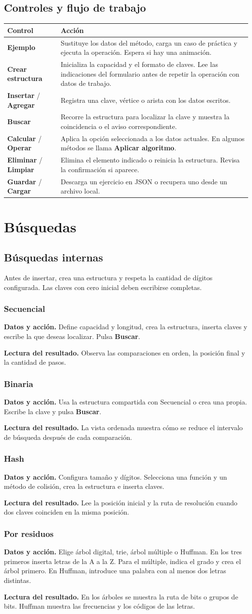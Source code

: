 \documentclass[11pt,a4paper]{report}
\newcommand{\boton}[1]{\textbf{#1}}
\newcommand{\metodo}[3]{\subsection{#1}\textbf{Datos y acción.} #2\par\textbf{Lectura del resultado.} #3}
\begin{document}
\section{Controles y flujo de trabajo}
\begin{tabularx}{\linewidth}{@{}p{.28\linewidth}X@{}}
\toprule
Control & Acción \\
\midrule
\boton{Ejemplo} & Sustituye los datos del método, carga un caso de práctica y ejecuta la operación. Espera si hay una animación. \\
\boton{Crear estructura} & Inicializa la capacidad y el formato de claves. Lee las indicaciones del formulario antes de repetir la operación con datos de trabajo. \\
\boton{Insertar} / \boton{Agregar} & Registra una clave, vértice o arista con los datos escritos. \\
\boton{Buscar} & Recorre la estructura para localizar la clave y muestra la coincidencia o el aviso correspondiente. \\
\boton{Calcular} / \boton{Operar} & Aplica la opción seleccionada a los datos actuales. En algunos métodos se llama \boton{Aplicar algoritmo}. \\
\boton{Eliminar} / \boton{Limpiar} & Elimina el elemento indicado o reinicia la estructura. Revisa la confirmación si aparece. \\
\boton{Guardar} / \boton{Cargar} & Descarga un ejercicio en JSON o recupera uno desde un archivo local. \\
\bottomrule
\end{tabularx}

\chapter{Búsquedas}
\section{Búsquedas internas}
Antes de insertar, crea una estructura y respeta la cantidad de dígitos configurada. Las claves con cero inicial deben escribirse completas.

\metodo{Secuencial}{Define capacidad y longitud, crea la estructura, inserta claves y escribe la que deseas localizar. Pulsa \boton{Buscar}.}{Observa las comparaciones en orden, la posición final y la cantidad de pasos.}
\metodo{Binaria}{Usa la estructura compartida con Secuencial o crea una propia. Escribe la clave y pulsa \boton{Buscar}.}{La vista ordenada muestra cómo se reduce el intervalo de búsqueda después de cada comparación.}
\metodo{Hash}{Configura tamaño y dígitos. Selecciona una función y un método de colisión, crea la estructura e inserta claves.}{Lee la posición inicial y la ruta de resolución cuando dos claves coinciden en la misma posición.}
\metodo{Por residuos}{Elige árbol digital, trie, árbol múltiple o Huffman. En los tres primeros inserta letras de la A a la Z. Para el múltiple, indica el grado y crea el árbol primero. En Huffman, introduce una palabra con al menos dos letras distintas.}{En los árboles se muestra la ruta de bits o grupos de bits. Huffman muestra las frecuencias y los códigos de las letras.}
\end{document}
